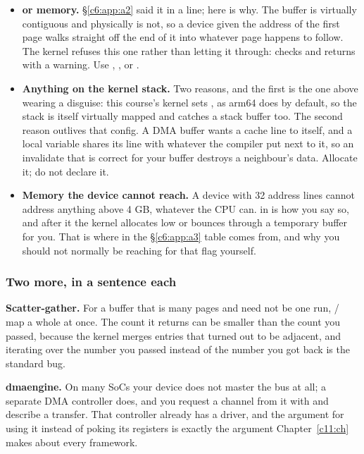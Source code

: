 \begin{itemize}
  \item \textbf{ or  memory.} \S\ref{c6:app:a2} said it in a line; here
    is why. The buffer is virtually contiguous and physically is not, so a device given the address
    of the first page walks straight off the end of it into whatever page happens to follow. The
    kernel refuses this one rather than letting it through:  checks
     and returns  with a warning. Use ,
    , or .
  \item \textbf{Anything on the kernel stack.} Two reasons, and the first is the one above wearing a
    disguise: this course's kernel sets , as arm64 does by default, so the
    stack is itself virtually mapped and  catches a stack buffer too. The
    second reason outlives that config. A DMA buffer wants a cache line to itself, and a local
    variable shares its line with whatever the compiler put next to it, so an invalidate that is
    correct for your buffer destroys a neighbour's data. Allocate it; do not declare it.
  \item \textbf{Memory the device cannot reach.} A device with 32 address lines cannot address
    anything above 4 GB, whatever the CPU can.  in  is how you say so, and after it the kernel allocates low or
    bounces through a temporary buffer for you. That is where  in the
    \S\ref{c6:app:a3} table comes from, and why you should not normally be reaching for that flag
    yourself.
\end{itemize}

\subsubsection{Two more, in a sentence each}
\label{c6:app:a:two-more-in-a-sentence-each}

\textbf{Scatter-gather.} For a buffer that is many pages and need not be one run,
/ map a whole  at once. The count it
returns can be smaller than the count you passed, because the kernel merges entries that turned out
to be adjacent, and iterating over the number you passed instead of the number you got back is the
standard bug.

\textbf{dmaengine.} On many SoCs your device does not master the bus at all; a separate DMA
controller does, and you request a channel from it with  and describe a
transfer. That controller already has a driver, and the argument for using it instead of poking its
registers is exactly the argument Chapter~\ref{c11:ch} makes about every framework.

